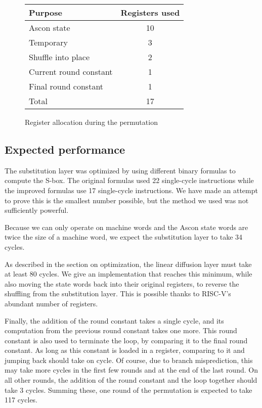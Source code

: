\begin{figure}
\caption{Register allocation during the permutation}
\begin{center}
\begin{tabular}{l c}
Purpose & Registers used \\ \hline
Ascon state & 10 \\
Temporary & 3 \\
Shuffle into place & 2 \\
Current round constant & 1 \\
Final round constant & 1 \\ \hline
Total & 17
\end{tabular}
\end{center}
\label{registers}
\end{figure}

\subsection{Expected performance}

The substitution layer was optimized by using different binary formulas to
compute the S-box. The original formulas used 22 single-cycle instructions while
the improved formulas use 17 single-cycle instructions. We have made an attempt
to prove this is the smallest number possible, but the method we used was not
sufficiently powerful.

Because we can only operate on machine words and the Ascon state words are twice
the size of a machine word, we expect the substitution layer to take 34 cycles.

As described in the section on optimization, the linear diffusion layer must
take at least 80 cycles. We give an implementation that reaches this minimum,
while also moving the state words back into their original registers, to reverse
the shuffling from the substitution layer. This is possible thanks to RISC-V's
abundant number of registers.

Finally, the addition of the round constant takes a single cycle, and its
computation from the previous round constant takes one more. This round constant
is also used to terminate the loop, by comparing it to the final round constant.
As long as this constant is loaded in a register, comparing to it and jumping
back should take on cycle. Of course, due to branch misprediction, this may take
more cycles in the first few rounds and at the end of the last round. On all
other rounds, the addition of the round constant and the loop together should
take 3 cycles. Summing these, one round of the permutation is expected to take
117 cycles.

